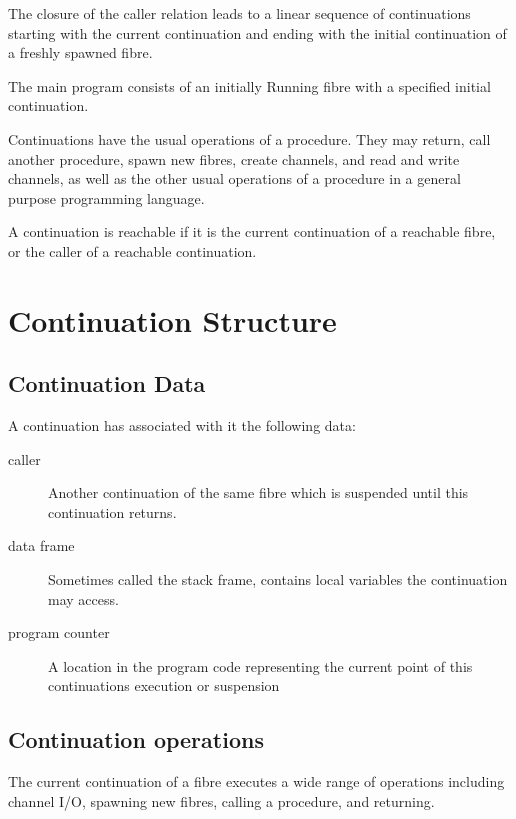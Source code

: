 \documentclass{article}
\begin{document}
The closure of the caller relation leads to a linear
sequence of continuations starting with the current
continuation and ending with the initial continuation
of a freshly spawned fibre.

The main program consists of an initially Running
fibre with a specified initial continuation.

Continuations have the usual operations of a procedure.
They may return, call another procedure, spawn new
fibres, create channels, and read and write channels,
as well as the other usual operations of a procedure
in a general purpose programming language.

A continuation is reachable if it is the current
continuation of a reachable fibre, or the caller
of a reachable continuation.

\section{Continuation Structure}
\subsection{Continuation Data}
A continuation has associated with it the following
data:

\begin{description}
\item[caller] Another continuation of the same fibre which is
suspended until this continuation returns.
\item[data frame] Sometimes called the stack frame, contains
local variables the continuation may access.
\item[program counter] A location in the program code representing
the current point of this continuations execution or suspension
\end{description}

\subsection{Continuation operations}
The current continuation of a fibre executes a wide range of
operations including channel I/O, spawning new fibres,
calling a procedure, and returning.
\end{document}
